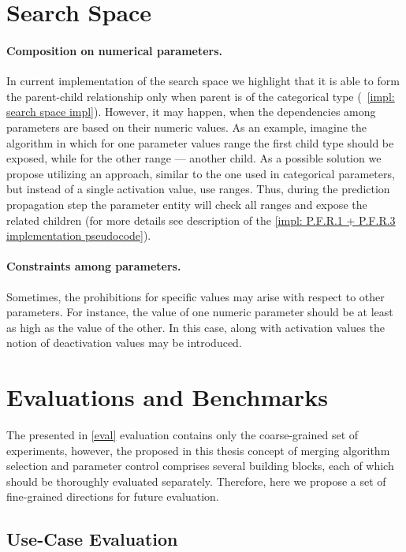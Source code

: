 \section{Search Space}\label{fw: search space}
\paragraph{Composition on numerical parameters.} In current implementation of the search space we highlight that it is able to form the parent-child relationship only when parent is of the categorical type (~\cref{impl: search space impl}). However, it may happen, when the dependencies among parameters are based on their numeric values. As an example, imagine the algorithm in which for one parameter values range the first child type should be exposed, while for the other range — another child. As a possible solution we propose utilizing an approach, similar to the one used in categorical parameters, but instead of a single activation value, use ranges. Thus, during the prediction propagation step the parameter entity will check all ranges and expose the related children (for more details see description of the \cref{impl: P.F.R.1 + P.F.R.3 implementation pseudocode}).

\paragraph{Constraints among parameters.} Sometimes, the prohibitions for specific values may arise with respect to other parameters. For instance, the value of one numeric parameter should be at least as high as the value of the other. In this case, along with activation values the notion of deactivation values may be introduced.

\section{Evaluations and Benchmarks}\label{fw: evaluation}
The presented in \cref{eval} evaluation contains only the coarse-grained set of experiments, however, the proposed in this thesis concept of merging algorithm selection and parameter control comprises several building blocks, each of which should be thoroughly evaluated separately. Therefore, here we propose a set of fine-grained directions for future evaluation.
 
\subsection{Use-Case Evaluation}
